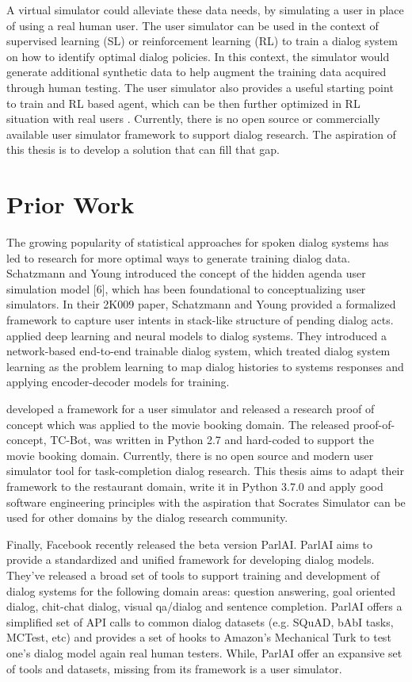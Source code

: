 A virtual simulator could alleviate these data needs, by simulating a user in place of using a real human user. The user simulator can be used in the context of supervised learning (SL) or reinforcement learning (RL) to train a dialog system on how to identify optimal dialog policies. In this context, the simulator would generate additional synthetic data to help augment the training data acquired through human testing. The user simulator also provides a useful starting point to train and RL based agent, which can be then further optimized in RL situation with real users \cite{li_usersim}. Currently, there is no open source or commercially available user simulator framework to support dialog research. The aspiration of this thesis is to develop a solution that can fill that gap. 

\section{Prior Work}
\label{sec:priorworks}

The growing popularity of statistical approaches for spoken dialog systems has led to research for more optimal ways to generate training dialog data. Schatzmann and Young introduced the concept of the hidden agenda user simulation model [6], which has been foundational to conceptualizing user simulators. In their 2K009 paper, Schatzmann and Young provided a formalized framework to capture user intents in stack-like structure of pending dialog acts. \cite{BordesW16} applied deep learning and neural models to dialog systems. They introduced a network-based end-to-end trainable dialog system, which treated dialog system learning as the problem learning to map dialog histories to systems responses and applying encoder-decoder models for training. 

\cite{li_usersim} developed a framework for a user simulator and released a research proof of concept which was applied to the movie booking domain. The released proof-of-concept, TC-Bot, was written in Python 2.7 and hard-coded to support the movie booking domain. Currently, there is no open source and modern user simulator tool for task-completion dialog research. This thesis aims to adapt their framework to the restaurant domain, write it in Python 3.7.0 and apply good software engineering principles with the aspiration that Socrates Simulator can be used for other domains by the dialog research community. 

Finally, Facebook recently released the beta version ParlAI. ParlAI aims to provide a standardized and unified framework for developing dialog models. They’ve released a broad set of tools to support training and development of dialog systems for the following domain areas: question answering, goal oriented dialog, chit-chat dialog, visual qa/dialog and sentence completion. ParlAI offers a simplified set of API calls to common dialog datasets (e.g. SQuAD, bAbI tasks, MCTest, etc) and provides a set of hooks to Amazon’s Mechanical Turk to test one’s dialog model again real human testers. While, ParlAI offer an expansive set of tools and datasets, missing from its framework is a user simulator. 


